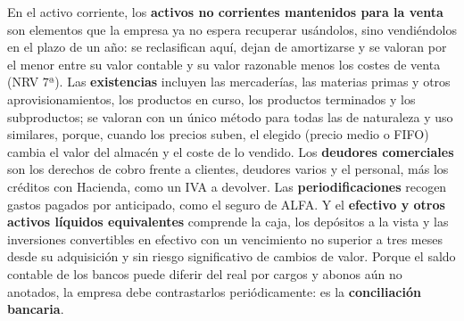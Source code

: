 \documentclass[10pt,a4paper]{article}
\begin{document}
En el activo corriente, los \textbf{activos no corrientes mantenidos para la venta} son elementos que la empresa ya no espera recuperar usándolos, sino vendiéndolos en el plazo de un año: se reclasifican aquí, dejan de amortizarse y se valoran por el menor entre su valor contable y su valor razonable menos los costes de venta (NRV $7$ª). Las \textbf{existencias} incluyen las mercaderías, las materias primas y otros aprovisionamientos, los productos en curso, los productos terminados y los subproductos; se valoran con un único método para todas las de naturaleza y uso similares, porque, cuando los precios suben, el elegido (precio medio o FIFO) cambia el valor del almacén y el coste de lo vendido. Los \textbf{deudores comerciales} son los derechos de cobro frente a clientes, deudores varios y el personal, más los créditos con Hacienda, como un IVA a devolver. Las \textbf{periodificaciones} recogen gastos pagados por anticipado, como el seguro de ALFA. Y el \textbf{efectivo y otros activos líquidos equivalentes} comprende la caja, los depósitos a la vista y las inversiones convertibles en efectivo con un vencimiento no superior a tres meses desde su adquisición y sin riesgo significativo de cambios de valor. Porque el saldo contable de los bancos puede diferir del real por cargos y abonos aún no anotados, la empresa debe contrastarlos periódicamente: es la \textbf{conciliación bancaria}.
\end{document}
